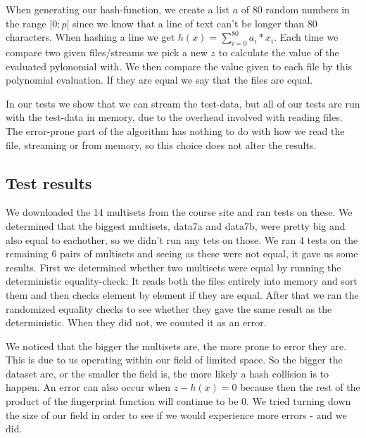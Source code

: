 \documentclass[article,a4paper,oneside]{article}
\newcommand{\+}[1]{\ensuremath{\boldsymbol{#1}}}
\begin{document}
When generating our hash-function, we create a list $a$ of 80 random numbers in the range $[0;p[$ since we know that a line of text can't be longer than 80 characters. When hashing a line we get $h(x) = \sum_{i=0}^{80}a_i*x_i $. Each time we compare two given files/streams we pick a new $z$ to calculate the value of the evaluated pylonomial with. We then compare the value given to each file by this polynomial evaluation. If they are equal we say that the files are equal.

	In our tests we show that we can stream the test-data, but all of our tests are run with the test-data in memory, due to the overhead involved with reading files. The error-prone part of the algorithm has nothing to do with how we read the file, streaming or from memory, so this choice does not alter the results. 

\subsection*{Test results}

We downloaded the 14 multisets from the course site and ran tests on these. We determined that the biggest multisets, data7a and data7b, were pretty big and also equal to eachother, so we didn't run any tets on those. We ran 4 tests on the remaining 6 pairs of multisets and seeing as these were not equal, it gave us some results. First we determined whether two multisets were equal by running the deterministic equality-check: It reads both the files entirely into memory and sort them and then checks element by element if they are equal. After that we ran the randomized equality checks to see whether they gave the same result as the deterministic. When they did not, we counted it as an error.

We noticed that the bigger the multisets are, the more prone to error they are. This is due to us operating within our field of limited space. So the bigger the dataset are, or the smaller the field is, the more likely a hash collision is to happen. An error can also occur when $z-h(x)=0$ because then the rest of the product of the fingerprint function will continue to be $0$. We tried turning down the size of our field in order to see if we would experience more errors - and we did.
\end{document}
